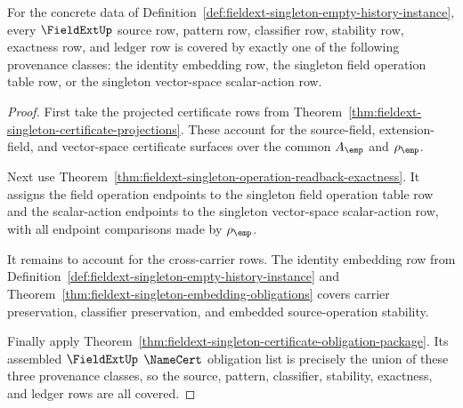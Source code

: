 \begin{theorem}
\label{thm:fieldext-singleton-exactness-ledger-coverage}
For the concrete data of
Definition~\ref{def:fieldext-singleton-empty-history-instance}, every
$\FieldExtUp$ source row, pattern row, classifier row, stability row,
exactness row, and ledger row is covered by exactly one of the following
provenance classes: the identity embedding row, the singleton field operation
table row, or the singleton vector-space scalar-action row.
\end{theorem}
\begin{proof}
First take the projected certificate rows from
Theorem~\ref{thm:fieldext-singleton-certificate-projections}. These account
for the source-field, extension-field, and vector-space certificate surfaces
over the common $A_{\emp}$ and $\rho_{\emp}$.

Next use
Theorem~\ref{thm:fieldext-singleton-operation-readback-exactness}. It assigns
the field operation endpoints to the singleton field operation table row and
the scalar-action endpoints to the singleton vector-space scalar-action row,
with all endpoint comparisons made by $\rho_{\emp}$.

It remains to account for the cross-carrier rows. The identity embedding row
from Definition~\ref{def:fieldext-singleton-empty-history-instance} and
Theorem~\ref{thm:fieldext-singleton-embedding-obligations} covers carrier
preservation, classifier preservation, and embedded source-operation
stability.

Finally apply
Theorem~\ref{thm:fieldext-singleton-certificate-obligation-package}. Its assembled
$\FieldExtUp$ $\NameCert$ obligation list is precisely the union of these
three provenance classes, so the source, pattern, classifier, stability,
exactness, and ledger rows are all covered.
\end{proof}
